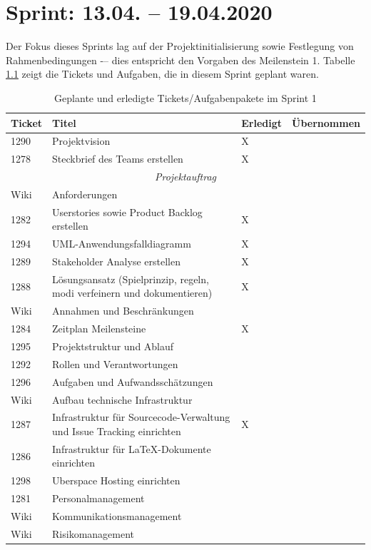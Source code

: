 \documentclass[a4paper,11pt,listof=numbered,glossary=totoc,parskip=half,toc=bib]{scrreprt}
\begin{document}
	\setcounter{lastRomanCounter}{\value{chapter}} %
	\newpage
	\renewcommand \thechapter{\arabic{chapter}}
	\setcounter{chapter}{0}


    \chapter{Sprint: 13.04. – 19.04.2020}
    
    Der Fokus dieses Sprints lag auf der Projektinitialisierung sowie Festlegung von Rahmenbedingungen -– dies entspricht den Vorgaben des Meilenstein 1. Tabelle \ref{tab:sprint1} zeigt die Tickets und Aufgaben, die in diesem Sprint geplant waren.
    
\begin{table}
    \begin{tabularx}{\textwidth}{lXll}
			\toprule
			\textbf{Ticket} & \textbf{Titel} & \textbf{Erledigt} & \textbf{Übernommen} \\
			\midrule
		1290	&	Projektvision	&	X	&		\\
		1278	&	Steckbrief des Teams erstellen	&	X	&		\\
		\midrule
		\multicolumn{4}{c}{\textit{Projektauftrag}}\\
		\midrule
		Wiki	&	Anforderungen 	&		&		\\
		1282	&	Userstories sowie Product Backlog erstellen	&	X	&		\\
		1294	&	UML-Anwendungsfalldiagramm	&	X	&		\\
		1289	&	Stakeholder Analyse erstellen	&	X	&		\\
		1288	&	Lösungsansatz (Spielprinzip, regeln, modi verfeinern und dokumentieren)	&	X	&		\\
		Wiki	&	Annahmen und Beschränkungen	&		&		\\
		1284	&	Zeitplan Meilensteine	&	X	&		\\
		1295	&	Projektstruktur und Ablauf	&		&		\\
		1292	&	Rollen und Verantwortungen	&		&		\\
		1296	&	Aufgaben und Aufwandsschätzungen	&		&		\\
		Wiki	&	Aufbau technische Infrastruktur	&		&		\\
		1287	&	Infrastruktur für Sourcecode-Verwaltung und Issue Tracking einrichten	&	X	&		\\
		1286	&	Infrastruktur für LaTeX-Dokumente einrichten	&		&		\\
		1298	&	Uberspace Hosting einrichten	&		&		\\
		1281	&	Personalmanagement	&		&		\\
		Wiki	&	Kommunikationsmanagement	&		&		\\
		Wiki	&	Risikomanagement	&		&		\\

			\bottomrule
		\end{tabularx}
\caption{Geplante und erledigte Tickets/Aufgabenpakete im Sprint 1}
\label{tab:sprint1}
\end{table}
    
\end{document}
